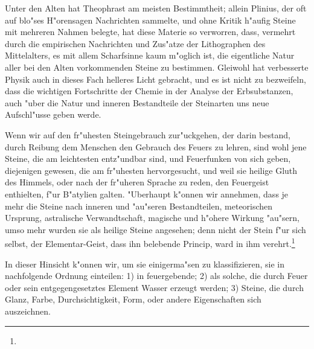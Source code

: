 \documentclass[a4paper, 11pt, oneside, polutonikogreek, german]{article}
\begin{document}
Unter den Alten hat Theophrast am meisten Bestimmtheit; allein Plinius, der oft auf blo"ses H"orensagen Nachrichten sammelte, und ohne Kritik h"aufig Steine mit mehreren Nahmen belegte, hat diese Materie so verworren, dass, vermehrt durch die empirischen Nachrichten und Zus"atze der Lithographen des Mittelalters, es mit allem Scharfsinne kaum m"oglich ist, die eigentliche Natur aller bei den Alten vorkommenden Steine zu bestimmen. Gleiwohl hat verbesserte Physik auch in dieses Fach helleres Licht gebracht, und es ist nicht zu bezweifeln, dass die wichtigen Fortschritte der Chemie in der Analyse der Erbsubstanzen, auch "uber die Natur und inneren Bestandteile der Steinarten uns neue Aufschl"usse geben werde.

Wenn wir auf den fr"uhesten Steingebrauch zur"uckgehen, der darin bestand, durch Reibung dem Menschen den Gebrauch des Feuers zu lehren, sind wohl jene Steine, die am leichtesten entz"undbar sind, und Feuerfunken von sich geben, diejenigen gewesen, die am fr"uhesten hervorgesucht, und weil sie heilige Gluth des Himmels, oder nach der fr"uheren Sprache zu reden, den Feuergeist enthielten, f"ur B"atylien galten. "Uberhaupt k"onnen wir annehmen, dass je mehr die Steine nach inneren und "au"seren Bestandteilen, meteorischen Ursprung, astralische Verwandtschaft, magische und h"ohere Wirkung "au"sern, umso mehr wurden sie als heilige Steine angesehen; denn nicht der Stein f"ur sich selbst, der Elementar-Geist, dass ihn belebende Princip, ward in ihm verehrt.\footnote{}

In dieser Hinsicht k"onnen wir, um sie einigerma"sen zu klassifizieren, sie in nachfolgende Ordnung einteilen: 1) in feuergebende; 2) als solche, die durch Feuer oder sein entgegengesetztes Element Wasser erzeugt werden; 3) Steine, die durch Glanz, Farbe, Durchsichtigkeit, Form, oder andere Eigenschaften sich auszeichnen.
\end{document}
